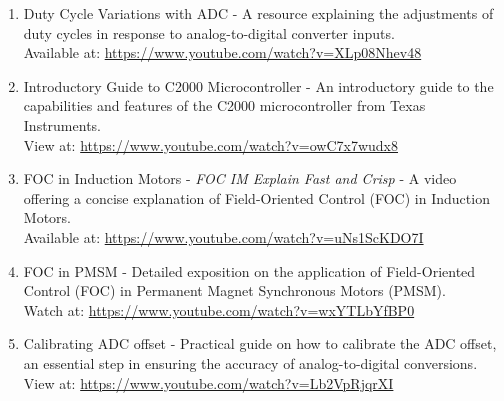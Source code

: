 \begin{enumerate}
    \item Duty Cycle Variations with ADC - A resource explaining the adjustments of duty cycles in response to analog-to-digital converter inputs.\\
          Available at: \url{https://www.youtube.com/watch?v=XLp08Nhev48}

    \item Introductory Guide to C2000 Microcontroller - An introductory guide to the capabilities and features of the C2000 microcontroller from Texas Instruments.\\
          View at: \url{https://www.youtube.com/watch?v=owC7x7wudx8}

    \item FOC in Induction Motors - \textit{FOC IM Explain Fast and Crisp} - A video offering a concise explanation of Field-Oriented Control (FOC) in Induction Motors.\\
          Available at: \url{https://www.youtube.com/watch?v=uNs1ScKDO7I}

    \item FOC in PMSM - Detailed exposition on the application of Field-Oriented Control (FOC) in Permanent Magnet Synchronous Motors (PMSM).\\
          Watch at: \url{https://www.youtube.com/watch?v=wxYTLbYfBP0}

    \item Calibrating ADC offset - Practical guide on how to calibrate the ADC offset, an essential step in ensuring the accuracy of analog-to-digital conversions.\\
          View at: \url{https://www.youtube.com/watch?v=Lb2VpRjqrXI}
\end{enumerate}

